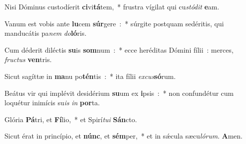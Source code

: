 ﻿\item Nisi Dóminus custodíerit \textbf{ci}vi\textbf{tá}tem,~* frustra vígilat qui cu\emph{stó}\emph{dit} \textbf{e}am.
\item Vanum est vobis ante \textbf{lu}cem \textbf{súr}gere~:~* súrgite postquam sedéritis, qui manducátis pa\emph{nem} \emph{do}\textbf{ló}ris.
\item Cum déderit diléctis \textbf{su}is \textbf{som}num~:~* ecce heréditas Dómini fílii~: merces, \emph{fru}\emph{ctus} \textbf{ven}tris.
\item Sicut sagíttæ in \textbf{ma}nu po\textbf{tén}tis~:~* ita fílii \emph{ex}\emph{cus}\textbf{só}rum.
\item Beátus vir qui implévit desidérium \textbf{su}um ex \textbf{i}psis~:~* non confundétur cum loquétur inimícis su\emph{is} \emph{in} \textbf{por}ta.
\item Glória \textbf{Pá}tri, et \textbf{Fí}lio,~* et Spirí\emph{tu}\emph{i} \textbf{Sán}cto.
\item Sicut érat in princípio, et \textbf{núnc}, et \textbf{sém}per,~* et in sǽcula sæcu\emph{ló}\emph{rum}. \textbf{A}men.
